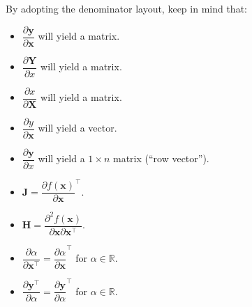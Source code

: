 By adopting the denominator layout, keep in mind that:
\begin{itemize}
    \item \(\dfrac{\partial \mathbf{y}}{\partial \mathbf{x}}\) will yield a matrix.
    \item \(\dfrac{\partial \mathbf{Y}}{\partial x}\) will yield a matrix.
    \item \(\dfrac{\partial x}{\partial \mathbf{X}}\) will yield a matrix.
    \item \(\dfrac{\partial y}{\partial \mathbf{x}}\) will yield a vector.
    \item \(\dfrac{\partial \mathbf{y}}{\partial x}\) will yield a \(1\times n\) matrix (``row vector'').
    \item \(\mathbf{J} = \dfrac{\partial f(\mathbf{x})}{\partial \mathbf{x}}^\top\).
    \item \(\mathbf{H} = \dfrac{\partial^{2} f(\mathbf{x})}{\partial\mathbf{x}\partial\mathbf{x}^\top}\).
    \item \(\dfrac{\partial\alpha}{\partial \mathbf{x}^\top} = \dfrac{\partial\alpha}{\partial \mathbf{x}}^\top\) for \(\alpha\in \mathbb{R}\).
    \item \(\dfrac{\partial \mathbf{y}^\top}{\partial \alpha} = \dfrac{\partial \mathbf{y}}{\partial \alpha}^\top\) for \(\alpha\in \mathbb{R}\).
\end{itemize}

